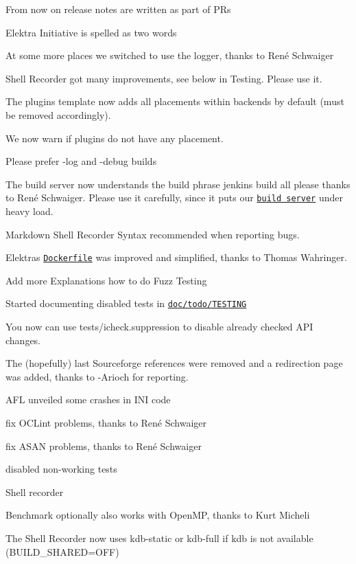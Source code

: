 \begin{DoxyItemize}
\item From now on release notes are written as part of P\+Rs
\item Elektra Initiative is spelled as two words
\item At some more places we switched to use the logger, thanks to René Schwaiger
\item Shell Recorder got many improvements, see below in Testing. Please use it.
\item The plugin\textquotesingle{}s template now adds all placements within backends by default (must be removed accordingly).
\item We now warn if plugins do not have any placement.
\item Please prefer -\/log and -\/debug builds
\item The build server now understands the build phrase {\ttfamily jenkins build all please} thanks to René Schwaiger. Please use it carefully, since it puts our \href{https://build.libelektra.org/}{\tt build server} under heavy load.
\item Markdown Shell Recorder Syntax recommended when reporting bugs.
\item Elektra\textquotesingle{}s \href{https://master.libelektra.org/scripts/docker/legacy/Dockerfile}{\tt Dockerfile} was improved and simplified, thanks to Thomas Wahringer.
\item Add more Explanations how to do Fuzz Testing
\item Started documenting disabled tests in \href{https://master.libelektra.org/doc/todo/TESTING}{\tt doc/todo/\+T\+E\+S\+T\+I\+NG}
\item You now can use {\ttfamily tests/icheck.\+suppression} to disable already checked A\+PI changes.
\item The (hopefully) last Sourceforge references were removed and a redirection page was added, thanks to -\/\+Arioch for reporting.
\end{DoxyItemize}


\begin{DoxyItemize}
\item A\+FL unveiled some crashes in I\+NI code
\item fix O\+C\+Lint problems, thanks to René Schwaiger
\item fix A\+S\+AN problems, thanks to René Schwaiger
\item disabled non-\/working tests
\item Shell recorder
\item Benchmark optionally also works with Open\+MP, thanks to Kurt Micheli
\item The Shell Recorder now uses {\ttfamily kdb-\/static} or {\ttfamily kdb-\/full} if {\ttfamily kdb} is not available ({\ttfamily B\+U\+I\+L\+D\+\_\+\+S\+H\+A\+R\+ED=O\+FF})
\end{DoxyItemize}

